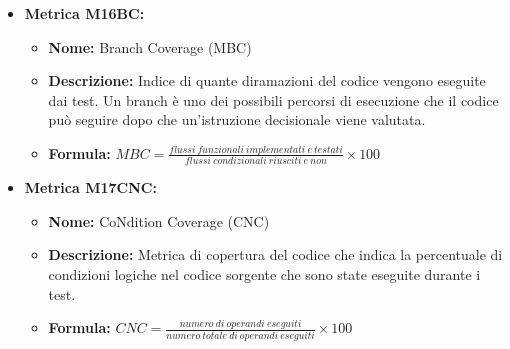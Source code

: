 \begin{itemize}
          \item \textbf{Metrica M16BC:}
          \begin{itemize}
              \item \textbf{Nome:} Branch Coverage (MBC)
              \item \textbf{Descrizione:} Indice di quante diramazioni del codice vengono eseguite dai test. Un branch è uno dei possibili percorsi di esecuzione che il codice può seguire dopo che un'istruzione decisionale viene valutata.
              \item \textbf{Formula:} $MBC = \frac{flussi \ funzionali \ implementati \ e \ testati}{flussi \ condizionali \ riusciti \ e \ non} \times 100$
          \end{itemize}

          \item \textbf{Metrica M17CNC:}
          \begin{itemize}
              \item \textbf{Nome:} CoNdition Coverage (CNC)
              \item \textbf{Descrizione:} Metrica di copertura del codice che indica la percentuale di condizioni logiche nel codice sorgente che sono state eseguite durante i test.
              \item \textbf{Formula:} $CNC = \frac{numero \ di \ operandi \ eseguiti}{numero \ totale \ di \ operandi \ eseguiti} \times 100$
          \end{itemize}
\end{itemize}

